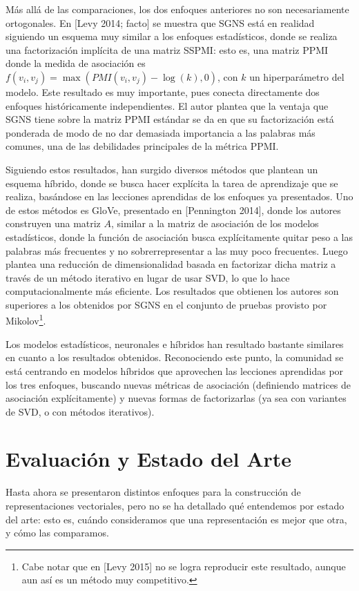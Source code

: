 Más allá de las comparaciones, los dos enfoques anteriores no son necesariamente ortogonales. En
[Levy 2014; facto] se muestra que SGNS está en realidad siguiendo un esquema muy similar a los
enfoques estadísticos, donde se realiza una factorización implícita de una matriz SSPMI\@: esto es,
una matriz PPMI donde la medida de asociación es $f(v_i, v_j) = \max(PMI(v_i, v_j) - \log(k), 0)$,
con $k$ un hiperparámetro del modelo. Este resultado es muy importante, pues conecta directamente
dos enfoques históricamente independientes. El autor plantea que la ventaja que SGNS tiene sobre la
matriz PPMI estándar se da en que su factorización está ponderada de modo de no dar demasiada
importancia a las palabras más comunes, una de las debilidades principales de la métrica PPMI\@.


Siguiendo estos resultados, han surgido diversos métodos que plantean un esquema híbrido, donde se
busca hacer explícita la tarea de aprendizaje que se realiza, basándose en las lecciones aprendidas
de los enfoques ya presentados. Uno de estos métodos es GloVe, presentado en [Pennington 2014],
donde los autores construyen una matriz $A$, similar a la matriz de asociación de los modelos
estadísticos, donde la función de asociación busca explícitamente quitar peso a las palabras más
frecuentes y no sobrerrepresentar a las muy poco frecuentes. Luego plantea una reducción de
dimensionalidad basada en factorizar dicha matriz a través de un método iterativo en lugar de usar
SVD, lo que lo hace computacionalmente más eficiente. Los resultados que obtienen los autores son
superiores a los obtenidos por SGNS en el conjunto de pruebas provisto por Mikolov\footnote{Cabe
notar que en [Levy 2015] no se logra reproducir este resultado, aunque aun así es un método muy
competitivo.}.


Los modelos estadísticos, neuronales e híbridos han resultado bastante similares en cuanto a los
resultados obtenidos. Reconociendo este punto, la comunidad se está centrando en modelos híbridos
que aprovechen las lecciones aprendidas por los tres enfoques, buscando nuevas métricas de
asociación (definiendo matrices de asociación explícitamente) y nuevas formas de factorizarlas (ya
sea con variantes de SVD, o con métodos iterativos).


\section{Evaluación y Estado del Arte}

Hasta ahora se presentaron distintos enfoques para la construcción de representaciones vectoriales,
pero no se ha detallado qué entendemos por estado del arte: esto es, cuándo consideramos que una
representación es mejor que otra, y cómo las comparamos.

